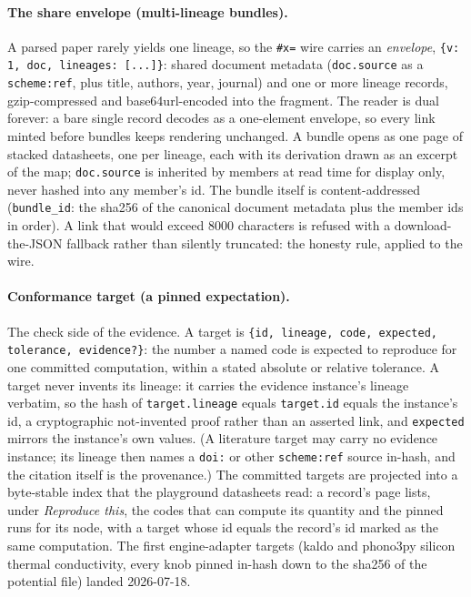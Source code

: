 \documentclass[11pt,a4paper]{article}
\begin{document}
\paragraph{The share envelope (multi-lineage bundles).} A parsed paper rarely
yields one lineage, so the \texttt{\#x=} wire carries an \emph{envelope},
\texttt{\{v: 1, doc, lineages: [...]\}}: shared document metadata
(\texttt{doc.source} as a \texttt{scheme:ref}, plus title, authors, year,
journal) and one or more lineage records, gzip-compressed and
base64url-encoded into the fragment. The reader is dual forever: a bare single
record decodes as a one-element envelope, so every link minted before bundles
keeps rendering unchanged. A bundle opens as one page of stacked datasheets,
one per lineage, each with its derivation drawn as an excerpt of the map;
\texttt{doc.source} is inherited by members at read time for display only,
never hashed into any member's id. The bundle itself is content-addressed
(\texttt{bundle\_id}: the sha256 of the canonical document metadata plus the
member ids in order). A link that would exceed 8000 characters is refused with
a download-the-JSON fallback rather than silently truncated: the honesty rule,
applied to the wire.

\paragraph{Conformance target (a pinned expectation).} The check side of the
evidence. A target is \texttt{\{id, lineage, code, expected, tolerance,
evidence?\}}: the number a named code is expected to reproduce for one
committed computation, within a stated absolute or relative tolerance. A
target never invents its lineage: it carries the evidence instance's lineage
verbatim, so the hash of \texttt{target.lineage} equals \texttt{target.id}
equals the instance's id, a cryptographic not-invented proof rather than an
asserted link, and \texttt{expected} mirrors the instance's own values. (A
literature target may carry no evidence instance; its lineage then names a
\texttt{doi:} or other \texttt{scheme:ref} source in-hash, and the citation
itself is the provenance.) The
committed targets are projected into a byte-stable index that the playground
datasheets read: a record's page lists, under \emph{Reproduce this}, the codes
that can compute its quantity and the pinned runs for its node, with a target
whose id equals the record's id marked as the same computation. The first
engine-adapter targets (kaldo and phono3py silicon thermal conductivity, every
knob pinned in-hash down to the sha256 of the potential file) landed
2026-07-18.
\end{document}

